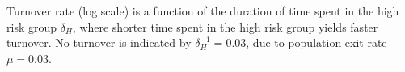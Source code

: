 Turnover rate (log scale) is a function of
the duration of time spent in the high risk group $\delta_H$,
where shorter time spent in the high risk group yields faster turnover.
No turnover is indicated by $\delta_H^{-1} = 0.03$,
due to population exit rate $\mu = 0.03$.